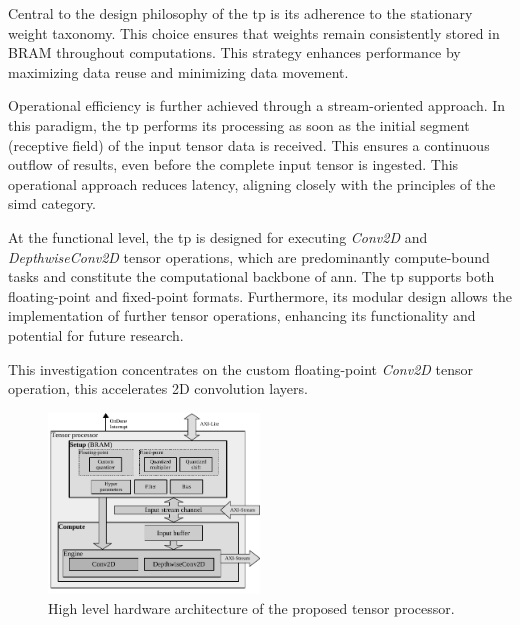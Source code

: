 Central to the design philosophy of the \gls{tp} is its adherence to the stationary weight taxonomy. This choice ensures that weights remain consistently stored in BRAM throughout computations. This strategy enhances performance by maximizing data reuse and minimizing data movement.

Operational efficiency is further achieved through a stream-oriented approach. In this paradigm, the \gls{tp} performs its processing as soon as the initial segment (receptive field) of the input tensor data is received. This ensures a continuous outflow of results, even before the complete input tensor is ingested. This operational approach reduces latency, aligning closely with the principles of the \gls{simd} category.
	
At the functional level, the \gls{tp} is designed for executing \textit{Conv2D} and \textit{DepthwiseConv2D} tensor operations, which are predominantly compute-bound tasks and constitute the computational backbone of \gls{ann}. The \gls{tp} supports both floating-point and fixed-point formats. Furthermore, its modular design allows the implementation of further tensor operations, enhancing its functionality and potential for future research.

This investigation concentrates on the custom floating-point \emph{Conv2D} tensor operation, this accelerates 2D convolution layers.

\begin{figure}[h!]
	\centering
	\includegraphics[width=0.5\textwidth]{./chapters/cnn_accelerator/figures/accelerator.pdf}
	\caption{High level hardware architecture of the proposed tensor processor.}
	\label{fig:accelerator}
\end{figure}
\FloatBarrier

